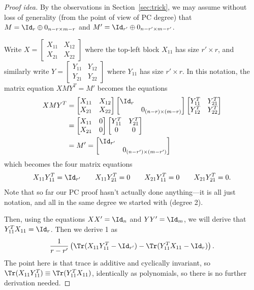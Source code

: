 \begin{proof}[Proof idea]
By the observations in Section~\ref{sec:trick}, we may assume without loss of generality (from the point of view of PC degree) that $M = \Id_r \oplus 0_{n - r \times m-r}$ and $M' = \Id_{r'} \oplus 0_{n-r' \times m-r'}$. 

Write $X = \begin{bmatrix} X_{11} & X_{12} \\ X_{21} & X_{22} \end{bmatrix}$ where the top-left block $X_{11}$ has size $r' \times r$, and similarly write $Y = \begin{bmatrix} Y_{11} & Y_{12} \\ Y_{21} & Y_{22} \end{bmatrix}$ where $Y_{11}$ has size $r' \times r$. In this notation, the matrix equation $XMY^T = M'$ becomes the equations
\begin{align*}
XMY^T & = \begin{bmatrix} X_{11} & X_{12} \\ X_{21} & X_{22} \end{bmatrix} \begin{bmatrix} \Id_r \\ & 0_{(n-r) \times (m-r)} \end{bmatrix} \begin{bmatrix} Y_{11}^T & Y_{21}^T \\ Y_{12}^T & Y_{22}^T  \end{bmatrix} \\
 & = \begin{bmatrix} X_{11} & 0 \\ X_{21} & 0 \end{bmatrix} \begin{bmatrix} Y_{11}^T & Y_{21}^T \\ 0 & 0 \end{bmatrix} \\
 & = M' = \begin{bmatrix} \Id_{r'} \\ & 0_{(n-r') \times (m-r')} \end{bmatrix}
\end{align*}
which becomes the four matrix equations
\begin{equation} \label{eq:2}
X_{11} Y_{11}^T = \Id_{r'} \qquad X_{11}Y_{21}^T = 0 \qquad X_{21}Y_{11}^T = 0 \qquad X_{21}Y_{21}^T = 0.
\end{equation}
Note that so far our PC proof hasn't actually done anything---it is all just notation, and all in the same degree we started with (degree 2).

Then, using the equations $XX' = \Id_n$ and $YY'=\Id_m$, we will derive that $Y_{11}^T X_{11} = \Id_r$. Then we derive 1 as 
\[
\frac{1}{r-r'}\left(\Tr(X_{11} Y_{11}^T - \Id_{r'}) - \Tr(Y_{11}^T X_{11} - \Id_r)\right).
\]
The point here is that trace is additive and cyclically invariant, so $\Tr(X_{11} Y_{11}^T) \equiv \Tr(Y_{11}^T X_{11})$, identically as polynomials, so there is no further derivation needed.
\end{proof}


